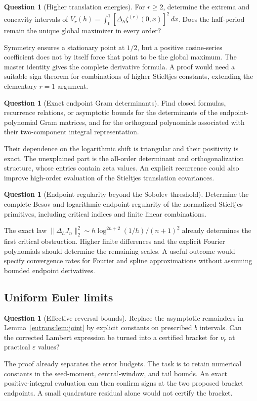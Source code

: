 \documentclass[11pt,a4paper]{article}
\numberwithin{equation}{section}
\theoremstyle{definition}
\newtheorem{question}[theorem]{Question}
\theoremstyle{remark}
\begin{document}
\begin{question}[Higher translation energies]
For $r\geq2$, determine the extrema and concavity intervals of
$V_r(h)=\int_0^1[\Delta_h\zeta^{(r)}(0,x)]^2\,dx$.
Does the half-period remain the unique global maximizer in every order?
\end{question}
Symmetry ensures a stationary point at $1/2$, but a positive cosine-series
coefficient does not by itself force that point to be the global maximum.
The master identity gives the complete derivative formula. A proof
would need a suitable sign theorem for combinations of higher
Stieltjes constants, extending the elementary $r=1$ argument.

\begin{question}[Exact endpoint Gram determinants]
Find closed formulas, recurrence relations, or asymptotic bounds for
the determinants of the endpoint-polynomial Gram matrices, and for
the orthogonal polynomials associated with their two-component
integral representation.
\end{question}
Their dependence on the logarithmic shift is triangular and their
positivity is exact. The unexplained part is the all-order determinant
and orthogonalization structure, whose entries contain zeta values.
An explicit recurrence could also improve high-order evaluation of
the Stieltjes translation covariances.

\begin{question}[Endpoint regularity beyond the Sobolev threshold]
Determine the complete Besov and logarithmic endpoint regularity of
the normalized Stieltjes primitives, including critical indices and
finite linear combinations.
\end{question}
The exact law $\|\Delta_hJ_n\|_2^2\sim
h\log^{2n+2}(1/h)/(n+1)^2$ already determines the first critical
obstruction. Higher finite differences and the explicit Fourier
polynomials should determine the remaining scales. A useful outcome
would specify convergence rates for Fourier and spline approximations
without assuming bounded endpoint derivatives.

\subsection{Uniform Euler limits}

\begin{question}[Effective reversal bounds]
Replace the asymptotic remainders in
Lemma~\ref{eutrans:lem:joint} by explicit constants on prescribed
$b$ intervals. Can the corrected Lambert expression be turned into
a certified bracket for $\nu_r$ at practical $\varepsilon$ values?
\end{question}
The proof already separates the error budgets. The task is to retain
numerical constants in the seed-moment, central-window, and tail bounds.
An exact positive-integral evaluation can then confirm signs at the
two proposed bracket endpoints. A small quadrature residual alone
would not certify the bracket.
\end{document}
